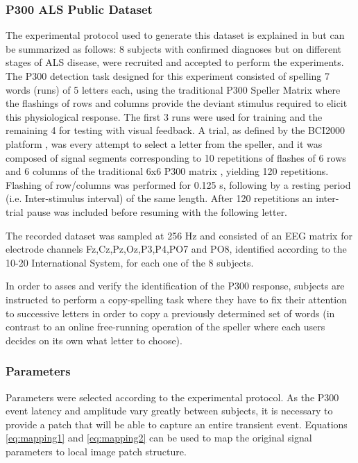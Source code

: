 \documentclass[entropy,article,submit,moreauthors,pdftex,10pt,a4paper]{mdpi}
\begin{document}
\subsubsection{P300 ALS Public Dataset}

The experimental protocol used to generate this dataset is explained in \citep{Riccio2013} but can be summarized as follows:  8 subjects with confirmed diagnoses but on different stages of ALS disease, were recruited and accepted to perform the experiments. The P300 detection task designed for this experiment consisted of spelling 7 words (runs) of 5 letters each, using the traditional P300 Speller Matrix \citep{Farwell1988} where the flashings of rows and columns provide the deviant stimulus required to elicit this physiological response.  The first 3 runs were used for training and the remaining 4 for testing with visual feedback.  A trial, as defined by the BCI2000 platform \citep{Schalk2004}, was every attempt to select a letter from the speller, and it was composed of signal segments corresponding to 10 repetitions of flashes of 6 rows and 6 columns of the traditional 6x6 P300 matrix , yielding 120 repetitions.  Flashing of row/columns was performed for 0.125 s, following by a resting period (i.e. Inter-stimulus interval) of the same length.  After 120 repetitions an inter-trial pause was included before resuming with the following letter.

The recorded dataset was sampled at 256 Hz and consisted of an EEG matrix for electrode channels Fz,Cz,Pz,Oz,P3,P4,PO7 and PO8, identified according to the 10-20 International System,  for each one of the 8 subjects.  

In order to asses and verify the identification of the P300 response, subjects are instructed to perform a copy-spelling task where they have to fix their attention to successive letters in order to copy a previously determined set of words (in contrast to an online free-running operation of the speller where each users decides on its own what letter to choose).

\subsubsection{Parameters}

Parameters were selected according to the experimental protocol. As the P300 event latency and amplitude vary greatly between subjects, it is necessary to provide a patch that will be able to capture an entire transient event.  Equations \ref{eq:mapping1} and \ref{eq:mapping2} can be used to map the original signal parameters to local image patch structure. 
\end{document}
